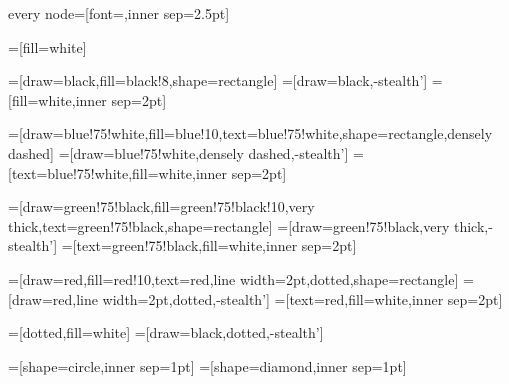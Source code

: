 \usepackage{tikz}
\usetikzlibrary{arrows,automata,positioning,er}

\tikzstyle every node=[font=\footnotesize\sffamily,inner sep=2.5pt]

\newcommand{\red}{red}
\newcommand{\redfill}{\red!10}
\newcommand{\green}{green!75!black}
\newcommand{\greenfill}{\green!10}
\newcommand{\blue}{blue!75!white}
\newcommand{\bluefill}{blue!10}
\newcommand{\grey}{black!8}
=[fill=white]

=[draw=black,fill=\grey,shape=rectangle]
=[draw=black,-stealth']
=[fill=white,inner sep=2pt]

=[draw=\blue,fill=\bluefill,text=\blue,shape=rectangle,densely dashed]
=[draw=\blue,densely dashed,-stealth']
=[text=\blue,fill=white,inner sep=2pt]

=[draw=\green,fill=\greenfill,very thick,text=\green,shape=rectangle]
=[draw=\green,very thick,-stealth']
=[text=\green,fill=white,inner sep=2pt]

=[draw=\red,fill=\redfill,text=\red,line width=2pt,dotted,shape=rectangle]
=[draw=\red,line width=2pt,dotted,-stealth']
=[text=\red,fill=white,inner sep=2pt]

=[dotted,fill=white]
=[draw=black,dotted,-stealth']

=[shape=circle,inner sep=1pt]
=[shape=diamond,inner sep=1pt]

\newcommand{\ml}[1]{
\begin{tabular}{@{}l@{}}#1\vspace{-2pt}\end{tabular}
}
